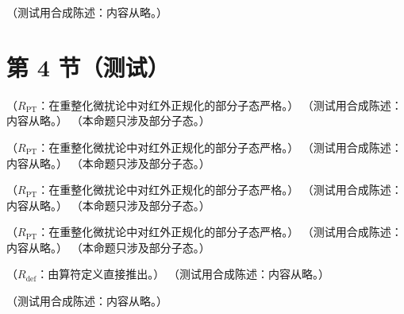 \begin{definition}\label{def:appO-sectors}
（测试用合成陈述：内容从略。）
\end{definition}

\section{第 4 节（测试）}\label{sec:appO-unitarity}

\begin{lemma}\label{lem:appO-joint-localization}
（$R_{\mathrm{PT}}$：在重整化微扰论中对红外正规化的部分子态严格。）
（测试用合成陈述：内容从略。）
（本命题只涉及部分子态。）
\end{lemma}

\begin{lemma}\label{lem:appO-multipole-localization}
（$R_{\mathrm{PT}}$：在重整化微扰论中对红外正规化的部分子态严格。）
（测试用合成陈述：内容从略。）
（本命题只涉及部分子态。）
\end{lemma}

\begin{lemma}\label{lem:appO-quadrant-residues}
（$R_{\mathrm{PT}}$：在重整化微扰论中对红外正规化的部分子态严格。）
（测试用合成陈述：内容从略。）
（本命题只涉及部分子态。）
\end{lemma}

\begin{lemma}\label{lem:appO-preintegration-localization}
（$R_{\mathrm{PT}}$：在重整化微扰论中对红外正规化的部分子态严格。）
（测试用合成陈述：内容从略。）
（本命题只涉及部分子态。）
\end{lemma}

\begin{lemma}\label{lem:appO-glauber-operator}
（$R_{\mathrm{def}}$：由算符定义直接推出。）
（测试用合成陈述：内容从略。）
\end{lemma}

\begin{definition}\label{def:appO-glob-model}
（测试用合成陈述：内容从略。）
\end{definition}

